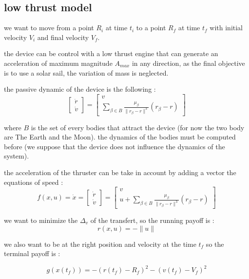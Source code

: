 \documentclass{article} %
\begin{document}
{			\subsection{low thrust model}
			
			we want to move from a point $R_i$ at time $t_i$ to a point $R_f$ at time $t_f$ with initial velocity $V_i$ and final velocity $V_f$.
			
			the device can be control with a low thrust engine that can generate an acceleration of maximum magnitude $A_{max}$ in any direction, as the final objective is to use a solar sail, the variation of mass is neglected.
			
			the passive dynamic of the device is the following : 
			$$
			\begin{bmatrix}
				\dot{r}\\
				\dot{v}
			\end{bmatrix} =\begin{bmatrix}
				v\\
				\sum\limits _{\beta \in B }\frac{\mu _{\beta }}{\| r_{\beta } -r\| ^{3}}( r_{\beta } -r)
			\end{bmatrix}
			$$
			
			where $B$ is the set of every bodies that attract the device (for now the two body are The Earth and the Moon). the dynamics of the bodies must be computed before (we suppose that the device does not influence the dynamics of the system).
			
			the acceleration of the thruster can be take in account by adding a vector the equations of speed : \\
			
			$$
			f(x,u)=\dot{x}=
			\begin{bmatrix}
				\dot{r}\\
				\dot{v}
			\end{bmatrix}
			=\begin{bmatrix}
				v\\
				u+\sum\limits _{\beta \in B }\frac{\mu _{\beta }}{\| r_{\beta } -r\| ^{3}}( r_{\beta } -r)
			\end{bmatrix}
			$$
			
			we want to minimize the $\Delta_v$ of the transfert, so the running payoff is :
			$$
			r(x,u)=-\|u\|
			$$ 
			
			we also want to be at the right position and velocity at the time $t_f$ so the terminal payoff is :
			
			$$
			g(x(t_f))=-(r(t_f)-R_f)^2-(v(t_f)-V_f)^2
			$$
			
}
\end{document}
